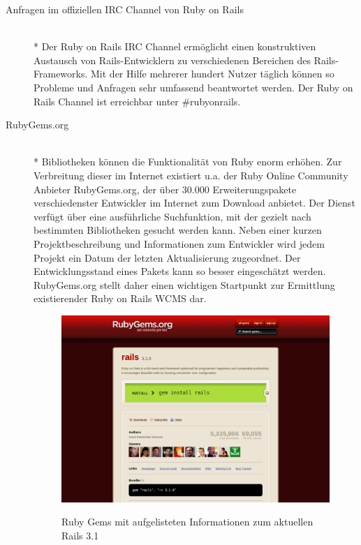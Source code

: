 \begin{description}
\item[Anfragen im offiziellen IRC Channel von Ruby on Rails]\mbox{~}\\*
Der Ruby on Rails IRC Channel ermöglicht einen konstruktiven Austausch von Rails-Entwicklern zu verschiedenen Bereichen des Rails-Frameworks. Mit der Hilfe mehrerer hundert Nutzer täglich können so Probleme und Anfragen sehr umfassend beantwortet werden. Der Ruby on Rails Channel ist erreichbar unter \#rubyonrails.
\item[RubyGems.org]\mbox{~}\\*
Bibliotheken können die Funktionalität von Ruby enorm erhöhen. Zur Verbreitung dieser im Internet existiert u.a. der Ruby Online Community Anbieter RubyGems.org, der über 30.000 Erweiterungspakete verschiedenster Entwickler im Internet zum Download anbietet.
Der Dienst verfügt über eine ausführliche Suchfunktion, mit der gezielt nach bestimmten Bibliotheken gesucht werden kann. Neben einer kurzen Projektbeschreibung und Informationen zum Entwickler wird jedem Projekt ein Datum der letzten Aktualisierung zugeordnet. Der Entwicklungsstand eines Pakets kann so besser eingeschätzt werden. RubyGems.org stellt daher einen wichtigen Startpunkt zur Ermittlung existierender Ruby on Rails WCMS dar.
\begin{figure}[!h]
\begin{center}
\label{fig.rubygems}
\includegraphics[scale=0.3]{images/analyse/rubygems/railsonrubygems.png}
\caption{Ruby Gems mit aufgelisteten Informationen zum aktuellen Rails 3.1}
\end{center}
\end{figure}

\end{description}
